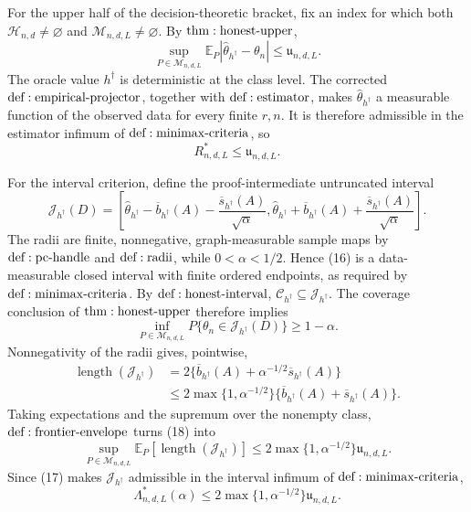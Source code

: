 For the upper half of the decision-theoretic bracket, fix an index for which both \(\mathcal H_{n,d}\ne\varnothing\) and \(\mathcal M_{n,d,L}\ne\varnothing\).  By \({\rm thm:honest\text{-}upper}\),
\[
 \sup_{P\in\mathcal M_{n,d,L}}
 \mathbb E_P|\widehat\theta_{h^\dagger}-\theta_n|
 \leq\mathfrak u_{n,d,L}.
\tag{14}
\]
The oracle value \(h^\dagger\) is deterministic at the class level.  The corrected \({\rm def:empirical\text{-}projector}\), together with \({\rm def:estimator}\), makes \(\widehat\theta_{h^\dagger}\) a measurable function of the observed data for every finite \(r,n\).  It is therefore admissible in the estimator infimum of \({\rm def:minimax\text{-}criteria}\), so
\[
 R^*_{n,d,L}\leq\mathfrak u_{n,d,L}.
\tag{15}
\]

For the interval criterion, define the proof-intermediate untruncated interval
\[
 \mathcal J_{h^\dagger}(D)=
 \left[
 \widehat\theta_{h^\dagger}-\overline b_{h^\dagger}(A)
 -\frac{\overline s_{h^\dagger}(A)}{\sqrt\alpha},
 \widehat\theta_{h^\dagger}+\overline b_{h^\dagger}(A)
 +\frac{\overline s_{h^\dagger}(A)}{\sqrt\alpha}
 \right].
\tag{16}
\]
The radii are finite, nonnegative, graph-measurable sample maps by \({\rm def:pc\text{-}handle}\) and \({\rm def:radii}\), while \(0<\alpha<1/2\).  Hence (16) is a data-measurable closed interval with finite ordered endpoints, as required by \({\rm def:minimax\text{-}criteria}\).  By \({\rm def:honest\text{-}interval}\), \(\mathcal C_{h^\dagger}\subseteq\mathcal J_{h^\dagger}\).  The coverage conclusion of \({\rm thm:honest\text{-}upper}\) therefore implies
\[
 \inf_{P\in\mathcal M_{n,d,L}}
 P\{\theta_n\in\mathcal J_{h^\dagger}(D)\}
 \geq1-\alpha.
\tag{17}
\]
Nonnegativity of the radii gives, pointwise,
\[
\begin{aligned}
 \operatorname{length}(\mathcal J_{h^\dagger})
 &=2\{\overline b_{h^\dagger}(A)
 +\alpha^{-1/2}\overline s_{h^\dagger}(A)\}\\
 &\leq2\max\{1,\alpha^{-1/2}\}
 \{\overline b_{h^\dagger}(A)+\overline s_{h^\dagger}(A)\}.
\end{aligned}
\tag{18}
\]
Taking expectations and the supremum over the nonempty class, \({\rm def:frontier\text{-}envelope}\) turns (18) into
\[
 \sup_{P\in\mathcal M_{n,d,L}}
 \mathbb E_P[\operatorname{length}(\mathcal J_{h^\dagger})]
 \leq2\max\{1,\alpha^{-1/2}\}\mathfrak u_{n,d,L}.
\tag{19}
\]
Since (17) makes \(\mathcal J_{h^\dagger}\) admissible in the interval infimum of \({\rm def:minimax\text{-}criteria}\),
\[
 \Lambda^*_{n,d,L}(\alpha)
 \leq2\max\{1,\alpha^{-1/2}\}\mathfrak u_{n,d,L}.
\tag{20}
\]

